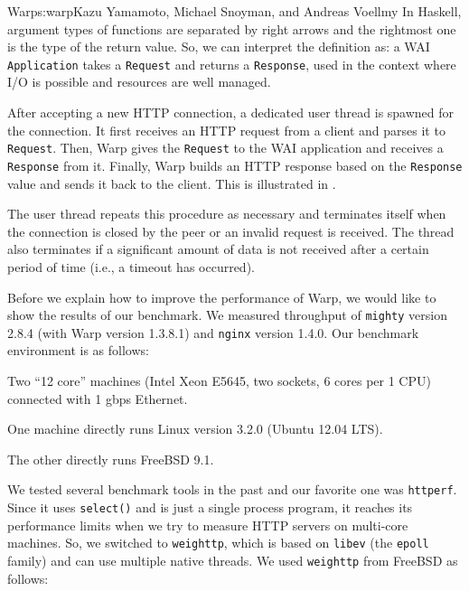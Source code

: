 \begin{aosachapter}{Warp}{s:warp}{Kazu Yamamoto, Michael Snoyman, and Andreas Voellmy}
In Haskell, argument types of functions are separated by right arrows
and the rightmost one is the type of the return value. So, we can
interpret the definition as: a WAI \texttt{Application} takes a
\texttt{Request} and returns a \texttt{Response}, used in the context
where I/O is possible and resources are well managed.

After accepting a new HTTP connection, a dedicated user thread is
spawned for the connection. It first receives an HTTP request from a
client and parses it to \texttt{Request}. Then, Warp gives the
\texttt{Request} to the WAI application and receives a \texttt{Response}
from it. Finally, Warp builds an HTTP response based on the
\texttt{Response} value and sends it back to the client. This is
illustrated in .


The user thread repeats this procedure as necessary and terminates
itself when the connection is closed by the peer or an invalid request
is received. The thread also terminates if a significant amount of data
is not received after a certain period of time (i.e., a timeout has
occurred).


Before we explain how to improve the performance of Warp, we would like
to show the results of our benchmark. We measured throughput of
\texttt{mighty} version 2.8.4 (with Warp version 1.3.8.1) and
\texttt{nginx} version 1.4.0. Our benchmark environment is as follows:

\begin{aosaitemize}

\item
  Two ``12 core'' machines (Intel Xeon E5645, two sockets, 6 cores per 1
  CPU) connected with 1 gbps Ethernet.
\item
  One machine directly runs Linux version 3.2.0 (Ubuntu 12.04 LTS).
\item
  The other directly runs FreeBSD 9.1.
\end{aosaitemize}

We tested several benchmark tools in the past and our favorite one was
\texttt{httperf}. Since it uses \texttt{select()} and is just a single
process program, it reaches its performance limits when we try to
measure HTTP servers on multi-core machines. So, we switched to
\texttt{weighttp}, which is based on \texttt{libev} (the \texttt{epoll}
family) and can use multiple native threads. We used \texttt{weighttp}
from FreeBSD as follows:


\end{aosachapter}
